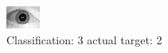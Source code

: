 \begin{figure}[h!]
\begin{center}
\includegraphics[width=0.60\columnwidth]{figures/ID1666_class_3_target_2.png}
\end{center}
\caption{ Classification: 3 actual target: 2}
\label{fig:ID1666_class_3_target_2}
\end{figure}
